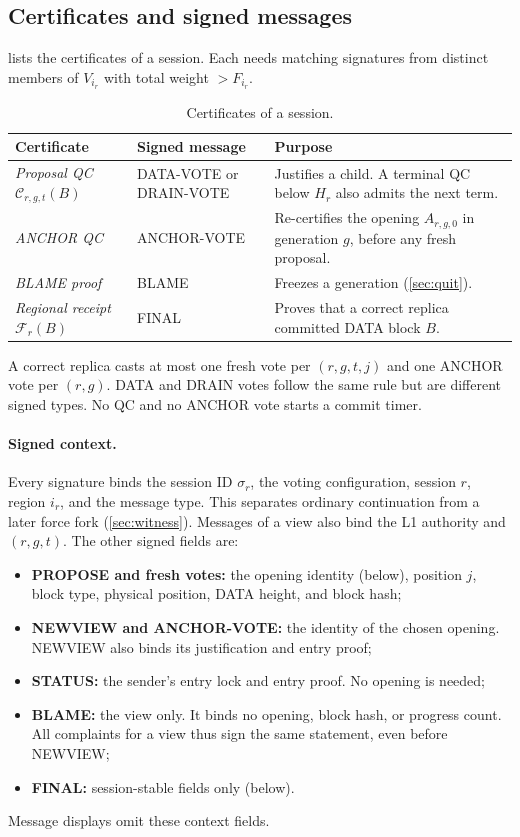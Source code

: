 \documentclass[11pt,a4paper]{article}
\newcommand{\QC}{\mathcal C}
\newcommand{\FC}{\mathcal F}
\newcommand{\defterm}[1]{\textcolor{rrBlue}{\textit{#1}}}
\begin{document}
\subsection{Certificates and signed messages}
\label{sec:certificates}
 lists the certificates of a session. Each needs
matching signatures from distinct members of $V_{i_r}$ with total weight
$>F_{i_r}$.

\begin{table}[htbp]\centering\small
\caption{Certificates of a session.}
\label{tab:certificates}
\begin{tabularx}{\linewidth}{@{}>{\raggedright\arraybackslash}p{.25\linewidth}>{\raggedright\arraybackslash}p{.24\linewidth}Y@{}}
\toprule
Certificate & Signed message & Purpose\\
\midrule
\defterm{Proposal QC} $\QC_{r,g,t}(B)$ & DATA-VOTE or DRAIN-VOTE & Justifies a
child. A terminal QC below $H_r$ also admits the next term.\\
\defterm{ANCHOR QC} & ANCHOR-VOTE & Re-certifies the opening $A_{r,g,0}$ in
generation $g$, before any fresh proposal.\\
\defterm{BLAME proof} & BLAME & Freezes a generation (\cref{sec:quit}).\\
\defterm{Regional receipt} $\FC_r(B)$ & FINAL & Proves that a correct replica
committed DATA block $B$.\\
\bottomrule
\end{tabularx}
\end{table}

A correct replica casts at most one fresh vote per $(r,g,t,j)$ and one
ANCHOR vote per $(r,g)$. DATA and DRAIN votes follow the same rule but
are different signed types. No QC and no ANCHOR vote starts a commit
timer.

\paragraph{Signed context.}
Every signature binds the session ID $\sigma_r$, the
voting configuration, session $r$, region $i_r$, and the message type.
This separates ordinary continuation from a later force fork
(\cref{sec:witness}). Messages of a view also bind the L1
authority and $(r,g,t)$. The other signed fields are:
\begin{itemize}
\item \textbf{PROPOSE and fresh votes:} the opening identity
(below), position $j$, block
type, physical position, DATA height, and block hash;
\item \textbf{NEWVIEW and ANCHOR-VOTE:} the identity of the chosen
opening. NEWVIEW also binds its justification and entry proof;
\item \textbf{STATUS:} the sender's entry lock and entry proof. No
opening is needed;
\item \textbf{BLAME:} the view only. It binds no opening, block hash, or
progress count. All complaints for a view thus sign the same statement,
even before NEWVIEW;
\item \textbf{FINAL:} session-stable fields only (below).
\end{itemize}
Message displays omit these context fields.
\end{document}
